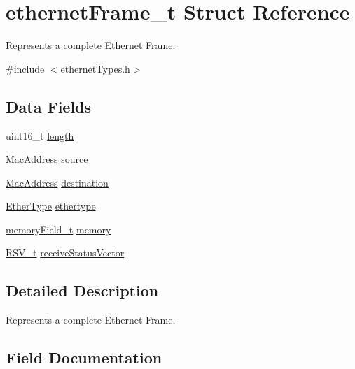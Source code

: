 \hypertarget{structethernet_frame__t}{}\section{ethernet\+Frame\+\_\+t Struct Reference}
\label{structethernet_frame__t}


Represents a complete Ethernet Frame.  




{\ttfamily \#include $<$ethernet\+Types.\+h$>$}

\subsection*{Data Fields}
\begin{DoxyCompactItemize}
\item 
uint16\+\_\+t \mbox{\hyperlink{structethernet_frame__t_a1892eba2086d12ac2b09005aeb09ea3b}{length}}
\item 
\mbox{\hyperlink{ethernet_types_8h_ae4e06476597d217d540a5e2b2d699649}{Mac\+Address}} \mbox{\hyperlink{structethernet_frame__t_ad921b9c440e49b18b551c1c6bda03dcc}{source}}
\item 
\mbox{\hyperlink{ethernet_types_8h_ae4e06476597d217d540a5e2b2d699649}{Mac\+Address}} \mbox{\hyperlink{structethernet_frame__t_a55c89de46e499edcb53dcccd41f5618a}{destination}}
\item 
\mbox{\hyperlink{group__ethernet_ga0720c9698bc7cdca5ef5923dad3eafe8}{Ether\+Type}} \mbox{\hyperlink{structethernet_frame__t_ad76bb4c877e40cfcd1182e3dc0e912d4}{ethertype}}
\item 
\mbox{\hyperlink{structmemory_field__t}{memory\+Field\+\_\+t}} \mbox{\hyperlink{structethernet_frame__t_ad8f3b87ff206655025f5734f21bce6e7}{memory}}
\item 
\mbox{\hyperlink{struct_r_s_v__t}{R\+S\+V\+\_\+t}} \mbox{\hyperlink{structethernet_frame__t_af988d23e385885326b7d93809d51bc30}{receive\+Status\+Vector}}
\end{DoxyCompactItemize}


\subsection{Detailed Description}
Represents a complete Ethernet Frame. 

\subsection{Field Documentation}
\mbox{\label{structethernet_frame__t_a55c89de46e499edcb53dcccd41f5618a}} 
